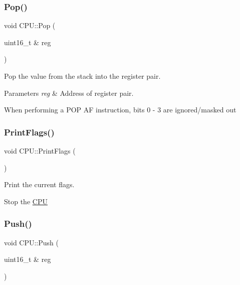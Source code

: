 \subsubsection{\texorpdfstring{Pop()}{Pop()}}
{\footnotesize\ttfamily void C\+P\+U\+::\+Pop (\begin{DoxyParamCaption}\item[{uint16\+\_\+t \&}]{reg }\end{DoxyParamCaption})\hspace{0.3cm}{\ttfamily [private]}}



Pop the value from the stack into the register pair. 


\begin{DoxyParams}{Parameters}
{\em reg} & Address of register pair.\\
\hline
\end{DoxyParams}
When performing a P\+OP AF instruction, bits 0 -\/ 3 are ignored/masked out \mbox{\label{classCPU_ad9a3c63b18e3bb12000972e2def9fec8}} 
\subsubsection{\texorpdfstring{Print\+Flags()}{PrintFlags()}}
{\footnotesize\ttfamily void C\+P\+U\+::\+Print\+Flags (\begin{DoxyParamCaption}{ }\end{DoxyParamCaption})\hspace{0.3cm}{\ttfamily [private]}}



Print the current flags. 

Stop the \mbox{\hyperlink{classCPU}{C\+PU}} \mbox{\label{classCPU_ad221c9a597631210ff5869b5449299e0}} 
\subsubsection{\texorpdfstring{Push()}{Push()}}
{\footnotesize\ttfamily void C\+P\+U\+::\+Push (\begin{DoxyParamCaption}\item[{uint16\+\_\+t \&}]{reg }\end{DoxyParamCaption})\hspace{0.3cm}{\ttfamily [private]}}



